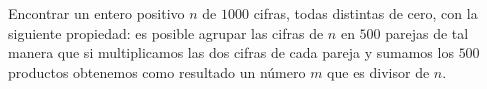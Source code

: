 Encontrar un entero positivo $n$ de $1000$ cifras, todas distintas de cero, con la siguiente propiedad: es posible agrupar las cifras de $n$ en $500$ parejas de tal manera que si multiplicamos las dos cifras de cada pareja y sumamos los $500$ productos obtenemos como resultado un número $m$ que es divisor de $n$.

